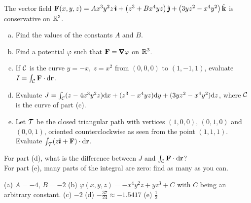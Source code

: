 \begin{question}[M317 2000A] %
 The vector field 
$\mathbf{F}(x,y,z)= Ax^3y^2z\,\hat{\pmb{\imath}}+\big(z^3+Bx^4yz\big)\,\hat{\pmb{\jmath}}
+\big(3yz^2-x^4y^2\big)\,\hat{\mathbf{k}}$ is conservative on $\mathbb{R}^3$.
\begin{enumerate}[(a)]
\item
Find the values of the constants $A$ and $B$.
\item
Find a potential $\varphi$ such that $\vF=\vnabla\varphi$ on
$\mathbb{R}^3$.
\item
If $\mathcal{C}$ is the curve $y=-x,\ z=x^2$ from $(0,0,0)$ to $(1,-1,1)$,
evaluate $I=\int_{\mathcal{C}} \mathbf{F}\cdot \mathrm{d}\mathbf{r}$.
\item
Evaluate 
$J=\int_{\mathcal{C}} (z-4x^3y^2z)\mathrm{d}x+(z^3-x^4yz)\mathrm{d}y+(3yz^2-x^4y^2)\mathrm{d}z$,
where $\mathcal{C}$ is the curve of part (c).
\item
Let $\mathcal{T}$ be the closed triangular path with vertices $(1,0,0)$,
$(0,1,0)$ and $(0,0,1)$, oriented counterclockwise as seen from the point
$(1,1,1)$. Evaluate $\int_{\mathcal{T}}(z\hat{\pmb{\imath}}+\mathbf{F})\cdot \mathrm{d}\mathbf{r}$.
\end{enumerate}
\end{question}

\begin{hint} 
For part (d), what is the difference between $J$ 
and $\int_{\mathcal{C}}\mathbf{F}\cdot\mathrm{d}\mathbf{r}$?\\
For part (e), many parts of the integral are zero: find as many as you can.
\end{hint}

\begin{answer}
(a) $A=-4$, $B=-2$\qquad
(b) $\varphi(x,y,z)=-x^4y^2z+yz^3+C$
with $C$ being an arbitrary constant. \qquad
(c) $-2$\qquad
(d) $-\frac{37}{24}\approx-1.5417$\qquad
(e) $\frac{1}{2}$
\end{answer}

